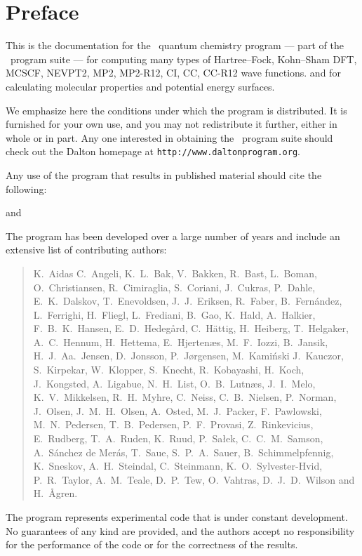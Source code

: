 \tableofcontents

\chapter*{Preface}

This is the documentation for the \dalton\ quantum chemistry program
--- part of the \latestrelease\ program suite ---
for computing many types of Hartree--Fock, Kohn--Sham DFT, 
MCSCF, NEVPT2, MP2, MP2-R12, CI, CC, CC-R12 wave functions.
and for calculating molecular properties and potential energy surfaces.

          We emphasize here the conditions under which the
program is distributed.  It is furnished for your own use,
and you may not redistribute it further, either in whole or in
part.  Any one interested in obtaining the \latestrelease\ program suite
should check out the Dalton homepage at \verb|http://www.daltonprogram.org|.

Any use of the program that results in published
material should cite the following:
\begin{quote}
\end{quote}
and
\begin{quote}
\end{quote}

The program has been developed over a large number of years and
include an extensive list of contributing authors:

\begin{quote}\raggedright
K.~Aidas
C.~Angeli,
K.~L.~Bak,
V.~Bakken,
R.~Bast,
L.~Boman,
O.~Christiansen,
R.~Cimiraglia,
S.~Coriani,
J.~Cukras,
P.~Dahle,
E.~K.~Dalskov,
T.~Enevoldsen,
J.~J.~Eriksen,
R.~Faber,
B.~Fern\'{a}ndez,
L.~Ferrighi,
H.~Fliegl,
L.~Frediani,
B.~Gao,
K.~Hald,
A.~Halkier,
F.~B.~K.~Hansen,
E.~D.~Hedeg\aa{}rd,
C.~H{\"a}ttig,
H.~Heiberg,
T.~Helgaker,
A.~C.~Hennum,
H.~Hettema,
E.~Hjerten\ae{}s,
M.~F.~Iozzi,
B.~Jansik,
H.~J.~Aa.~Jensen,
D.~Jonsson,
P.~J{\o}rgensen,
M.~Kami{\'n}ski
J.~Kauczor,
S.~Kirpekar,
W.~Klopper,
S.~Knecht,
R.~Kobayashi,
H.~Koch,
J.~Kongsted,
A.~Ligabue,
N.~H.~List,
O.~B.~Lutn\ae{}s,
J.~I.~Melo,
K.~V.~Mikkelsen,
R.~H.~Myhre,
C.~Neiss,
C.~B.~Nielsen,
P.~Norman,
J.~Olsen,
J.~M.~H.~Olsen,
A.~Osted,
M.~J.~Packer,
F.~Pawlowski,
M.~N.~Pedersen,
T.~B.~Pedersen,
P.~F.~Provasi,
Z.~Rinkevicius,
E.~Rudberg,
T.~A.~Ruden,
K.~Ruud,
P.~Sa\l{}ek,
C.~C.~M.~Samson,
A.~S\'{a}nchez de Mer\'{a}s,
T.~Saue,
S.~P.~A.~Sauer,
B.~Schimmelpfennig,
K.~Sneskov,
A.~H.~Steindal,
C.~Steinmann,
K.~O.~Sylvester-Hvid,
P.~R.~Taylor,
A.~M.~Teale,
D.~P.~Tew,
O.~Vahtras,
D.~J.~D.~Wilson
and H.~{\AA}gren.
\end{quote}

          The program represents experimental code that is
under constant development.  No guarantees of any kind are
provided, and the authors accept no responsibility for the
performance of the code or for the correctness of the results.
